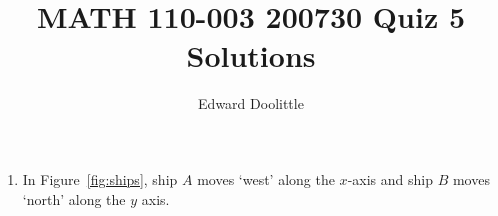 \documentclass[12pt]{article}
\title{MATH 110-003 200730 Quiz 5 Solutions}
\author{Edward Doolittle}
\begin{document}
\maketitle

\begin{enumerate}
\item In Figure~\ref{fig:ships}, ship $A$ moves `west' along the $x$-axis
  and ship $B$ moves `north' along the $y$ axis.
\end{enumerate}
\end{document}
